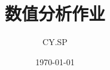 \documentclass[11pt,a4paper]{ctexart}
\title{数值分析作业}
\author{CY.SP}
\date{\today}
\numberwithin{equation}{subsection}
\begin{document}
	\newpage
	\maketitle
	\tableofcontents
	\everymath{\displaystyle}
	\clearpage
	
	
	
	
	
	
	
	
	
	
	
	
	
	
	
	\ClearWallPaper
\end{document}
